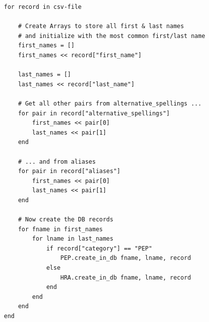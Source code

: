 \documentclass[a4paper, oneside]{csthesis}
\begin{document}
\begin{lstlisting}[caption={The Algorithm that parses the csv file creates a separate DB record for each first/last name pair},label={lst:world-check-parse}]
for record in csv-file

    # Create Arrays to store all first & last names
    # and initialize with the most common first/last name
    first_names = []
    first_names << record["first_name"]

    last_names = []
    last_names << record["last_name"]

    # Get all other pairs from alternative_spellings ...
    for pair in record["alternative_spellings"]
        first_names << pair[0]
        last_names << pair[1]
    end

    # ... and from aliases
    for pair in record["aliases"]
        first_names << pair[0]
        last_names << pair[1]
    end

    # Now create the DB records
    for fname in first_names
        for lname in last_names
            if record["category"] == "PEP"
                PEP.create_in_db fname, lname, record
            else
                HRA.create_in_db fname, lname, record
            end
        end
    end
end
\end{lstlisting}
\end{document}
